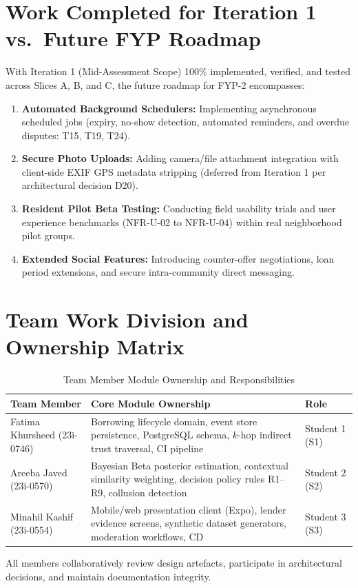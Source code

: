 \section{Work Completed for Iteration 1 vs.\ Future FYP Roadmap}
With Iteration 1 (Mid-Assessment Scope) 100\% implemented, verified, and tested across Slices A, B, and C, the future roadmap for FYP-2 encompasses:
\begin{enumerate}
    \item \textbf{Automated Background Schedulers:} Implementing asynchronous scheduled jobs (expiry, no-show detection, automated reminders, and overdue disputes: T15, T19, T24).
    \item \textbf{Secure Photo Uploads:} Adding camera/file attachment integration with client-side EXIF GPS metadata stripping (deferred from Iteration 1 per architectural decision D20).
    \item \textbf{Resident Pilot Beta Testing:} Conducting field usability trials and user experience benchmarks (NFR-U-02 to NFR-U-04) within real neighborhood pilot groups.
    \item \textbf{Extended Social Features:} Introducing counter-offer negotiations, loan period extensions, and secure intra-community direct messaging.
\end{enumerate}

\section{Team Work Division and Ownership Matrix}
\begin{table}[htbp]
\centering
\caption{Team Member Module Ownership and Responsibilities}
\label{tab:work_division}
\small
\begin{tabularx}{\textwidth}{l p{7.5cm} l}
\toprule
\textbf{Team Member} & \textbf{Core Module Ownership} & \textbf{Role} \\
\midrule
Fatima Khursheed (23i-0746) & Borrowing lifecycle domain, event store persistence, PostgreSQL schema, $k$-hop indirect trust traversal, CI pipeline & Student 1 (S1) \\
Areeba Javed (23i-0570) & Bayesian Beta posterior estimation, contextual similarity weighting, decision policy rules R1--R9, collusion detection & Student 2 (S2) \\
Minahil Kashif (23i-0554) & Mobile/web presentation client (Expo), lender evidence screens, synthetic dataset generators, moderation workflows, CD & Student 3 (S3) \\
\bottomrule
\end{tabularx}
\end{table}
All members collaboratively review design artefacts, participate in architectural decisions, and maintain documentation integrity.
